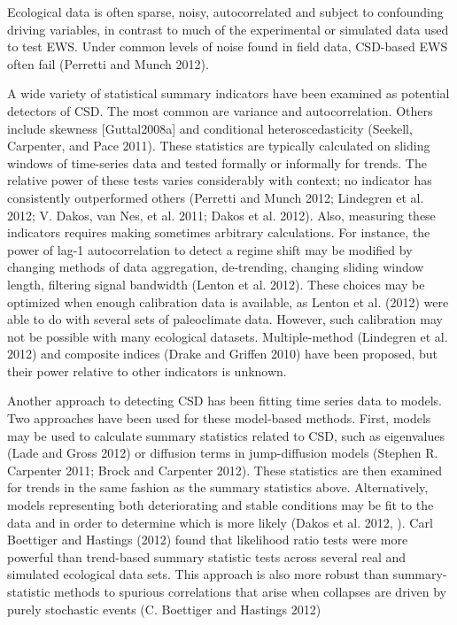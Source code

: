\documentclass[author-year, review]{elsarticle} %
\begin{document}
Ecological data is often sparse, noisy, autocorrelated and subject to
confounding driving variables, in contrast to much of the experimental
or simulated data used to test EWS. Under common levels of noise found
in field data, CSD-based EWS often fail (Perretti and Munch 2012).

A wide variety of statistical summary indicators have been examined as
potential detectors of CSD. The most common are variance and
autocorrelation. Others include skewness {[}Guttal2008a{]} and
conditional heteroscedasticity (Seekell, Carpenter, and Pace 2011).
These statistics are typically calculated on sliding windows of
time-series data and tested formally or informally for trends. The
relative power of these tests varies considerably with context; no
indicator has consistently outperformed others (Perretti and Munch 2012;
Lindegren et al. 2012; V. Dakos, van Nes, et al. 2011; Dakos et al.
2012). Also, measuring these indicators requires making sometimes
arbitrary calculations. For instance, the power of lag-1 autocorrelation
to detect a regime shift may be modified by changing methods of data
aggregation, de-trending, changing sliding window length, filtering
signal bandwidth (Lenton et al. 2012). These choices may be optimized
when enough calibration data is available, as Lenton et al. (2012) were
able to do with several sets of paleoclimate data. However, such
calibration may not be possible with many ecological datasets.
Multiple-method (Lindegren et al. 2012) and composite indices (Drake and
Griffen 2010) have been proposed, but their power relative to other
indicators is unknown.

Another approach to detecting CSD has been fitting time series data to
models. Two approaches have been used for these model-based methods.
First, models may be used to calculate summary statistics related to
CSD, such as eigenvalues (Lade and Gross 2012) or diffusion terms in
jump-diffusion models (Stephen R. Carpenter 2011; Brock and Carpenter
2012). These statistics are then examined for trends in the same fashion
as the summary statistics above. Alternatively, models representing both
deteriorating and stable conditions may be fit to the data and in order
to determine which is more likely (Dakos et al. 2012, ). Carl Boettiger
and Hastings (2012) found that likelihood ratio tests were more powerful
than trend-based summary statistic tests across several real and
simulated ecological data sets. This approach is also more robust than
summary-statistic methods to spurious correlations that arise when
collapses are driven by purely stochastic events (C. Boettiger and
Hastings 2012)
\end{document}
